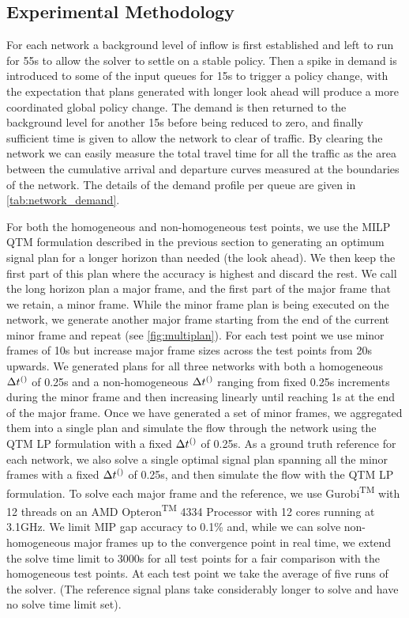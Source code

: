\subsection{Experimental Methodology}
For each network a background level of inflow is first established and left to run 
for 55s to allow the solver to settle on a stable policy. Then a spike in demand is 
introduced to some of the input 
queues for 15s to trigger a policy change, with the expectation that plans 
generated with longer look ahead will produce a more coordinated global policy 
change. The demand is then returned to the 
background level for another 15s before being reduced to zero, and finally 
sufficient time is given to allow the network to clear of traffic. By clearing the 
network we can easily measure the total travel 
time for all the traffic as the area between the cumulative arrival and departure 
curves measured at the boundaries of the network. The details of the demand 
profile per queue are given in 
\cref{tab:network_demand}.

For both the homogeneous and non-homogeneous test points,
we use the MILP QTM formulation described in the previous section to 
generating an optimum signal plan for a longer horizon than needed (the look ahead). 
We then keep the
first part of this plan where the accuracy is highest and discard the
rest. We call the long horizon plan a major frame, and the first part of the major 
frame that we retain, a minor frame. While the minor frame
plan is being executed on the network, we generate another major frame 
starting from the end of the current minor frame and
repeat (see \cref{fig:multiplan}). For each test point we use minor frames of 10s 
but increase major frame sizes across the test points from 20s upwards. We 
generated plans for all three networks with 
both a homogeneous $\DT[]$ of 0.25s
and a non-homogeneous $\DT[]$ ranging from fixed 0.25s increments
during the minor frame and then increasing linearly until reaching 1s at
the end of the major frame. Once we have generated a set of minor
frames, we aggregated them into a single plan and simulate the flow through the network using the QTM LP formulation with a fixed $\DT[]$ of 
0.25s. As a ground truth reference for each network, we also solve a single optimal signal plan spanning all the minor frames with a fixed $\DT[]$ of 0.25s, and then simulate the flow with the QTM LP formulation. 
To solve each major frame and the reference, we use Gurobi\textsuperscript{TM} with 12 threads on an AMD Opteron\textsuperscript{TM} 
4334 Processor with 12 cores running at 3.1GHz. We limit MIP gap accuracy to 
0.1\% and, while we can solve non-
homogeneous major frames up to the convergence point in real time, we 
extend the solve time limit to 3000s for all test points for a fair comparison with 
the homogeneous test points. At each test 
point we take the average of five runs of the solver. (The reference signal plans take considerably longer to solve and have no solve time limit set).

